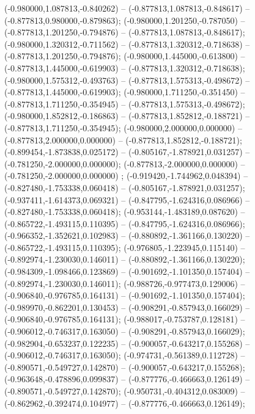  (-0.980000,1.087813,-0.840262) -- (-0.877813,1.087813,-0.848617) -- (-0.877813,0.980000,-0.879863);
 (-0.980000,1.201250,-0.787050) -- (-0.877813,1.201250,-0.794876) -- (-0.877813,1.087813,-0.848617);
 (-0.980000,1.320312,-0.711562) -- (-0.877813,1.320312,-0.718638) -- (-0.877813,1.201250,-0.794876);
 (-0.980000,1.445000,-0.613800) -- (-0.877813,1.445000,-0.619903) -- (-0.877813,1.320312,-0.718638);
 (-0.980000,1.575312,-0.493763) -- (-0.877813,1.575313,-0.498672) -- (-0.877813,1.445000,-0.619903);
 (-0.980000,1.711250,-0.351450) -- (-0.877813,1.711250,-0.354945) -- (-0.877813,1.575313,-0.498672);
 (-0.980000,1.852812,-0.186863) -- (-0.877813,1.852812,-0.188721) -- (-0.877813,1.711250,-0.354945);
 (-0.980000,2.000000,0.000000) -- (-0.877813,2.000000,0.000000) -- (-0.877813,1.852812,-0.188721);
 (-0.899454,-1.873838,0.025172) -- (-0.805167,-1.878921,0.031257) -- (-0.781250,-2.000000,0.000000);
 (-0.877813,-2.000000,0.000000) -- (-0.781250,-2.000000,0.000000) ;
 (-0.919420,-1.744962,0.048394) -- (-0.827480,-1.753338,0.060418) -- (-0.805167,-1.878921,0.031257);
 (-0.937411,-1.614373,0.069321) -- (-0.847795,-1.624316,0.086966) -- (-0.827480,-1.753338,0.060418);
 (-0.953144,-1.483189,0.087620) -- (-0.865722,-1.493115,0.110395) -- (-0.847795,-1.624316,0.086966);
 (-0.966352,-1.352621,0.102983) -- (-0.880892,-1.361166,0.130220) -- (-0.865722,-1.493115,0.110395);
 (-0.976805,-1.223945,0.115140) -- (-0.892974,-1.230030,0.146011) -- (-0.880892,-1.361166,0.130220);
 (-0.984309,-1.098466,0.123869) -- (-0.901692,-1.101350,0.157404) -- (-0.892974,-1.230030,0.146011);
 (-0.988726,-0.977473,0.129006) -- (-0.906840,-0.976785,0.164131) -- (-0.901692,-1.101350,0.157404);
 (-0.989970,-0.862201,0.130453) -- (-0.908291,-0.857943,0.166029) -- (-0.906840,-0.976785,0.164131);
 (-0.988017,-0.753787,0.128181) -- (-0.906012,-0.746317,0.163050) -- (-0.908291,-0.857943,0.166029);
 (-0.982904,-0.653237,0.122235) -- (-0.900057,-0.643217,0.155268) -- (-0.906012,-0.746317,0.163050);
 (-0.974731,-0.561389,0.112728) -- (-0.890571,-0.549727,0.142870) -- (-0.900057,-0.643217,0.155268);
 (-0.963648,-0.478896,0.099837) -- (-0.877776,-0.466663,0.126149) -- (-0.890571,-0.549727,0.142870);
 (-0.950731,-0.404312,0.083009) -- (-0.862962,-0.392474,0.104977) -- (-0.877776,-0.466663,0.126149);
